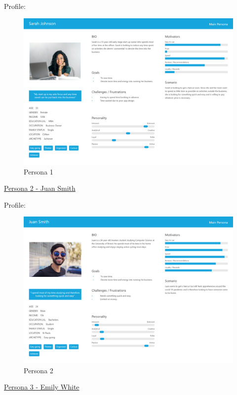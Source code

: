 \documentclass[12pt]{article}
\begin{document}
		Profile: 
		\begin{figure}[H]
			\includegraphics[scale=0.2]{images/persona_1.png}
			\caption{Persona 1}
			\label{fig:persona_1}
		\end{figure}
	

		
		\underline{Persona 2 - Juan Smith}
		
		
		Profile: 
		\begin{figure}[H]			
			\includegraphics[scale=0.2]{images/persona_2.png}
			\caption{Persona 2}
			\label{fig:persona_2}
		\end{figure}
		
		\underline{Persona 3 - Emily White}
		
\end{document}
